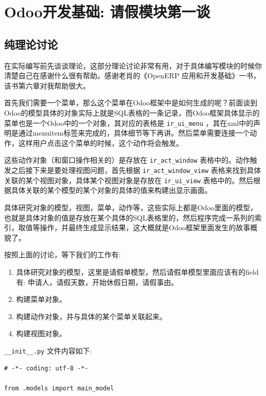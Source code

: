\documentclass[11pt,a4paper]{sphinxmanual}
\begin{document}
\chapter{Odoo开发基础: 请假模块第一谈}
\label{sec-6}
\section{纯理论讨论}
\label{sec-6-1}
在实际编写前先谈谈理论，这部分理论讨论非常有用，对于具体编写模块的时候你清楚自己在感谢什么很有帮助。感谢老肖的《OpenERP 应用和开发基础》一书，该书第六章对我帮助很大。

首先我们需要一个菜单，那么这个菜单在Odoo框架中是如何生成的呢？前面谈到Odoo的模型具体的对象实际上就是SQL表格的一条记录，而Odoo框架具体显示的菜单也是一个Odoo中的一个对象，其对应的表格是 \verb~ir_ui_menu~ ，其在xml中的声明是通过menuitem标签来完成的，具体细节等下再讲。然后菜单需要连接一个动作，这样用户点击这个菜单的时候，这个动作将会触发。

这些动作对象（和窗口操作相关的）是存放在 \verb~ir_act_window~ 表格中的。动作触发之后接下来是要处理视图问题，首先根据 \verb~ir_act_window_view~ 表格来找到具体关联的某个视图对象，具体某个视图对象是存放在 \verb~ir_ui_view~ 表格中的。然后根据具体关联的某个模型的某个对象的具体的值来构建出显示画面。

具体研究对象的模型，视图，菜单，动作等，这些实际上都是Odoo里面的模型，也就是具体对象的值是存放在某个具体的SQL表格里的，然后程序完成一系列的索引，取值等操作，并最终生成显示结果，这大概就是Odoo框架里面发生的故事概貌了。

按照上面的讨论，等下我们的工作有:
\begin{enumerate}
\item 具体研究对象的模型，这里是请假单模型，然后请假单模型里面应该有的field有: 申请人，请假天数，开始休假日期，请假事由。
\item 构建菜单对象。
\item 构建动作对象，并与具体的某个菜单关联起来。
\item 构建视图对象。
\end{enumerate}

\verb~__init__.py~ 文件内容如下:
\begin{verbatim}
# -*- coding: utf-8 -*-

from .models import main_model
\end{verbatim}
\end{document}
